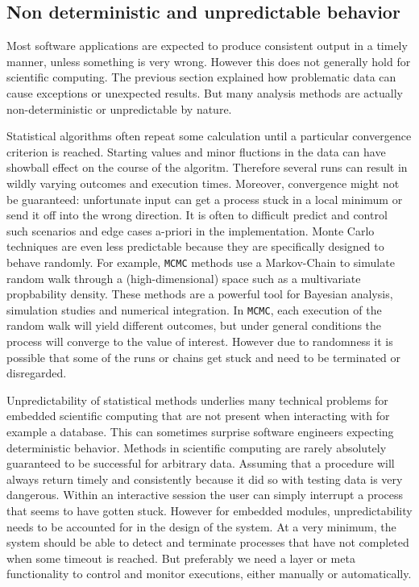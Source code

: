 \documentclass{article}
\newcommand{\MCMC}{\texttt{MCMC}\xspace}
\begin{document}
\subsection{Non deterministic and unpredictable behavior}

Most software applications are expected to produce consistent output in a timely manner, unless something is very wrong. However this does not generally hold for scientific computing. The previous section explained how problematic data can cause exceptions or unexpected results. But many analysis methods are actually non-deterministic or unpredictable by nature.

Statistical algorithms often repeat some calculation until a particular convergence criterion is reached. Starting values and minor fluctions in the data can have showball effect on the course of the algoritm. Therefore several runs can result in wildly varying outcomes and execution times. Moreover, convergence might not be guaranteed: unfortunate input can get a process stuck in a local minimum or send it off into the wrong direction. It is often to difficult predict and control such scenarios and edge cases a-priori in the implementation. Monte Carlo techniques are even less predictable because they are specifically designed to behave randomly. For example, \MCMC methods use a Markov-Chain to simulate random walk through a (high-dimensional) space such as a multivariate propbability density. These methods are a powerful tool for Bayesian analysis, simulation studies and numerical integration. In \MCMC, each execution of the random walk will yield different outcomes, but under general conditions the process will converge to the value of interest. However due to randomness it is possible that some of the runs or chains get stuck and need to be terminated or disregarded.

Unpredictability of statistical methods underlies many technical problems for embedded scientific computing that are not present when interacting with for example a database. This can sometimes surprise software engineers expecting deterministic behavior. Methods in scientific computing are rarely absolutely guaranteed to be successful for arbitrary data. Assuming that a procedure will always return timely and consistently because it did so with testing data is very dangerous. Within an interactive session the user can simply interrupt a process that seems to have gotten stuck. However for embedded modules, unpredictability needs to be accounted for in the design of the system. At a very minimum, the system should be able to detect and terminate processes that have not completed when some timeout is reached. But preferably we need a layer or meta functionality to control and monitor executions, either manually or automatically. 
\end{document}
